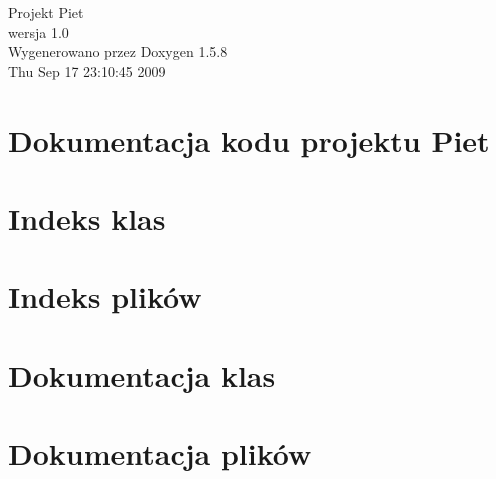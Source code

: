\documentclass[a4paper]{book}
\begin{document}
\begin{titlepage}
\vspace*{7cm}
\begin{center}
{\Large Projekt Piet \\[1ex]\large wersja 1.0 }\\
\vspace*{1cm}
{\large Wygenerowano przez Doxygen 1.5.8}\\
\vspace*{0.5cm}
{\small Thu Sep 17 23:10:45 2009}\\
\end{center}
\end{titlepage}
\clearemptydoublepage
{}
\tableofcontents
\clearemptydoublepage
{}
\chapter{Dokumentacja kodu projektu Piet}
\label{index}\hypertarget{index}{}
\chapter{Indeks klas}

\chapter{Indeks plików}

\chapter{Dokumentacja klas}







\chapter{Dokumentacja plików}
















\printindex
\end{document}

